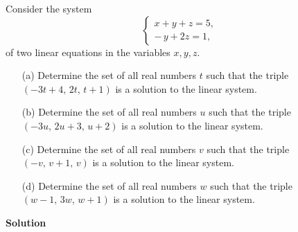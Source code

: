 \documentclass{article}
\newcommand{\solution}{\textbf{\large Solution}}
\theoremstyle{remark}
\begin{document}
Consider the system
\[
\begin{cases}
x + y + z = 5,\\
-\,y + 2z = 1,
\end{cases}
\]
of two linear equations in the variables $x, y, z$.
\begin{enumerate}
    \item[(a)] Determine the set of all real numbers $t$ such that the triple $(-3t + 4,\, 2t,\, t + 1)$ is a solution
    to the linear system.
    \item[(b)] Determine the set of all real numbers $u$ such that the triple $(-3u,\, 2u + 3,\, u + 2)$ is a solution
    to the linear system.
    \item[(c)] Determine the set of all real numbers $v$ such that the triple $(-v,\, v + 1,\, v)$ is a solution to
    the linear system.
    \item[(d)] Determine the set of all real numbers $w$ such that the triple $(w - 1,\, 3w,\, w + 1)$ is a solution
    to the linear system.
\end{enumerate}

\medskip
\solution
\end{document}
